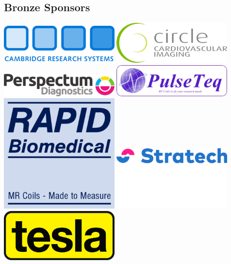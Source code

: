 \documentclass[a5paper,10pt,twoside,onecolumn,openany,helvetica,showtrims]{memoir}
\begin{document}
\subsection{Bronze Sponsors}
\begin{center}
\vfill
		\includegraphics[width=0.45\textwidth]{Sponsors/converted/crs_logo} \hfill
		\includegraphics[width=0.45\textwidth]{Sponsors/converted/Circle_Logo} \\
	\vfill 
		\includegraphics[width=0.45\textwidth]{Sponsors/converted/perspectum_logo} \hfill
		\includegraphics[width=0.45\textwidth]{Sponsors/converted/pulseteq_logo} \\ 
	\vfill		
	\includegraphics[width=0.45\textwidth]{Sponsors/converted/rapid_logo} \hfill \includegraphics[width=0.45\textwidth]{Sponsors/converted/stratech_logo} \\ 
	\vfill
	\includegraphics[width=0.45\textwidth]{Sponsors/converted/Tesla_Logo_notext}
	\vfill
\end{center}
\end{document}
